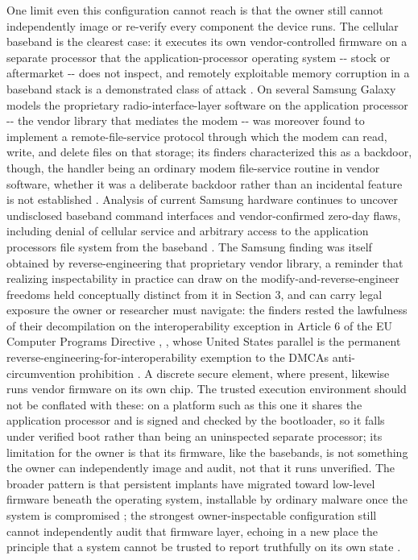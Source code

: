 \documentclass[
]{article}
\begin{document}
One limit even this configuration cannot reach is that the owner still
cannot independently image or re-verify every component the device runs.
The cellular baseband is the clearest case: it executes its own
vendor-controlled firmware on a separate processor that the
application-processor operating system -\/- stock or aftermarket -\/-
does not inspect, and remotely exploitable memory corruption in a
baseband stack is a demonstrated class of attack
\citep{weinmann-baseband}. On several Samsung Galaxy models the
proprietary radio-interface-layer software on the application processor
-\/- the vendor library that mediates the modem -\/- was moreover found
to implement a remote-file-service protocol through which the modem can
read, write, and delete files on that storage; its finders characterized
this as a backdoor, though, the handler being an ordinary modem
file-service routine in vendor software, whether it was a deliberate
backdoor rather than an incidental feature is not established
\citep{replicant-samsung-backdoor}. Analysis of current Samsung hardware
continues to uncover undisclosed baseband command interfaces and
vendor-confirmed zero-day flaws, including denial of cellular service
and arbitrary access to the application processor\textquotesingle s file
system from the baseband \citep{li-basemirror}. The Samsung finding was
itself obtained by reverse-engineering that proprietary vendor library,
a reminder that realizing inspectability in practice can draw on the
modify-and-reverse-engineer freedoms held conceptually distinct from it
in Section 3, and can carry legal exposure the owner or researcher must
navigate: the finders rested the lawfulness of their decompilation on
the interoperability exception in Article 6 of the EU Computer Programs
Directive \citep{replicant-samsung-backdoor-wiki},
\citep{eu-computer-programs-directive}, whose United States parallel is
the permanent reverse-engineering-for-interoperability exemption to the
DMCA\textquotesingle s anti-circumvention prohibition
\citep{dmca-1201f}. A discrete secure element, where present, likewise
runs vendor firmware on its own chip. The trusted execution environment
should not be conflated with these: on a platform such as this one it
shares the application processor and is signed and checked by the
bootloader, so it falls under verified boot rather than being an
uninspected separate processor; its limitation for the owner is that its
firmware, like the baseband\textquotesingle s, is not something the
owner can independently image and audit, not that it runs unverified.
The broader pattern is that persistent implants have migrated toward
low-level firmware beneath the operating system, installable by ordinary
malware once the system is compromised \citep{zaddach-hdd-backdoor}; the
strongest owner-inspectable configuration still cannot independently
audit that firmware layer, echoing in a new place the principle that a
system cannot be trusted to report truthfully on its own state
\citep{thompson-trusting-trust}.
\end{document}
